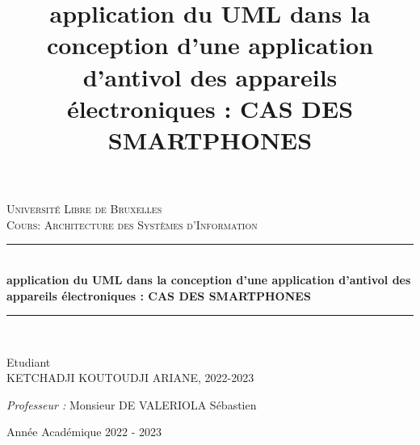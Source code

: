 \documentclass[a4paper, 12pt]{article}
\title{application du UML dans la conception d’une application d’antivol des appareils électroniques : CAS DES SMARTPHONES }
\date{} %
\newcommand{\HRule}{\rule{\linewidth}{0.5mm}}
\begin{document}
\begin{titlepage}
  \begin{sffamily}
  \begin{center}


    \textsc{\LARGE Université Libre de Bruxelles}\\[2cm]

    \textsc{\Large Cours: Architecture des Systèmes d'Information}\\[1.5cm]

    \HRule \\[0.4cm]
    { \huge \bfseries application du UML dans la conception d’une application d’antivol des appareils électroniques : CAS DES SMARTPHONES }\\[0.4cm]

    \HRule \\[2cm]


    \begin{minipage}{0.4\textwidth}
      \begin{flushleft} \large
        Etudiant\\
        KETCHADJI KOUTOUDJI ARIANE, 2022-2023\\
      \end{flushleft}
    \end{minipage}
    \begin{minipage}{0.4\textwidth}
      \begin{flushright} \large
        \emph{Professeur :} Monsieur   DE VALERIOLA Sébastien\\
       
      \end{flushright}
    \end{minipage}

    \vfill

    {\large Année Académique 2022 - 2023}

  \end{center}
  \end{sffamily}
\end{titlepage}





\newpage
\renewcommand{\contentsname}{Sommaire}
\setcounter{tocdepth}{4}
\tableofcontents
\newpage
\end{document}
